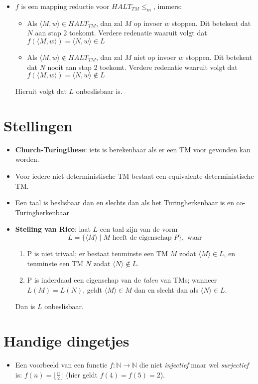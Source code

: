 \documentclass[]{article}
\begin{document}
\begin{itemize}
\begin{description}
\begin{itemize}
		\item $f$ is een mapping reductie voor $HALT_{TM} \leq_m$, immers:
		\begin{itemize}
			\item Als $\langle M, w \rangle \in HALT_{TM}$, dan zal $M$ op invoer $w$ stoppen. Dit betekent dat $N$ aan stap 2 toekomt. Verdere redenatie waaruit volgt dat $f( \langle M, w \rangle ) = \langle N, w \rangle \in L$
			\item Als $\langle M, w \rangle \notin HALT_{TM}$, dan zal $M$ niet op invoer $w$ stoppen. Dit betekent dat $N$ nooit aan stap 2 toekomt. Verdere redenatie waaruit volgt dat $f( \langle M, w \rangle ) = \langle N, w \rangle \notin L$
		\end{itemize}
	Hieruit volgt dat $L$ onbeslisbaar is.
	\end{itemize}
\end{description}
\end{itemize}

\section*{Stellingen}
\begin{itemize}
	\item \textbf{Church-Turingthese}: iets is berekenbaar als er een TM voor gevonden kan worden.
	
	\item Voor iedere niet-deterministische TM bestaat een equivalente deterministische TM.
	
	\item Een taal is beslisbaar dan en slechts dan als het Turingherkenbaar is en co-Turingherkenbaar
	
	\item \textbf{Stelling van Rice}: laat $L$ een taal zijn van de vorm
	$$L = \{ \langle M \rangle \mid M \mbox{ heeft de eigenschap } P \}, \mbox{ waar}$$
	\begin{enumerate}
		\item P is niet trivaal; er bestaat tenminste een TM $M$ zodat $\langle M \rangle \in L$, en tenminste een TM $N$ zodat $\langle N \rangle \notin L$.
		\item P is inderdaad een eigenschap van de \emph{talen} van TMs; wanneer $L(M) = L(N)$, geldt $\langle M \rangle \in M$ dan en slecht dan als $\langle N \rangle \in L$.
	\end{enumerate}
	Dan is $L$ onbeslisbaar.
\end{itemize}

\section*{Handige dingetjes}
\begin{itemize}
	\item Een voorbeeld van een functie $f \colon \mathbb{N} \rightarrow \mathbb{N}$ die niet \emph{injectief} maar wel \emph{surjectief} is: $f(n) = \lfloor \frac{n}{2} \rfloor$ (hier geldt $f(4) = f(5) = 2$).
\end{itemize}
\end{document}
